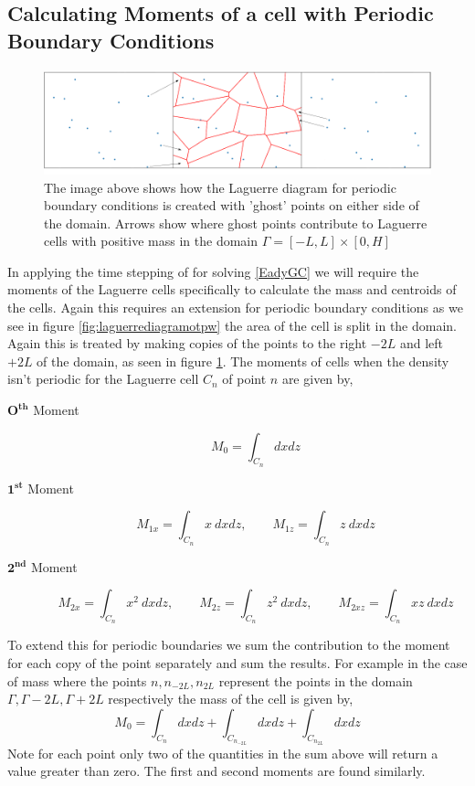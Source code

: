 \subsection{Calculating Moments of a cell with Periodic Boundary Conditions}
\begin{figure}[ht!]
	\centering
	\includegraphics[width=1\linewidth]{project/laguerre_diagram_OTPw_periodic}
	\caption[Periodic boundary conditions with 'ghost' points]{The image above shows how the Laguerre diagram for periodic boundary conditions is created with 'ghost' points on either side of the domain. Arrows show where ghost points contribute to Laguerre cells with positive mass in the domain $\Gamma = [-L,L]\times [0,H]$ }
	\label{laguerre diagram copies}
\end{figure}
In applying the time stepping of for solving \ref{EadyGC} we will require the moments of the Laguerre cells specifically to calculate the mass and centroids of the cells. Again this requires an extension for periodic boundary conditions as we see in figure \ref{fig:laguerrediagramotpw} the area of the cell is split in the domain. Again this is treated by making copies of the points to the right $-2L$ and left $+2L$ of the domain, as seen in figure \ref{laguerre diagram copies}. The moments of cells when the density isn't periodic for the Laguerre cell $C_n$ of point $n$  are given by,
\begin{description}
	\item [$\bm{O^{th}}$ Moment] 
	\begin{equation}
	M_0 = \int_{C_n} dxdz
	\end{equation}
	\item[$\bm{1^{st}}$ Moment]
	\begin{equation}
	M_{1x} = \int_{C_n} x \ dxdz, \qquad M_{1z} = \int_{C_n} z \ dxdz
	\end{equation}
	\item[$\bm{2^{nd}}$ Moment]
	\begin{equation}
	M_{2x} = \int_{C_n} x^2 \ dxdz, \qquad M_{2z} = \int_{C_n} z^2 \ dxdz, \qquad M_{2xz} = \int_{C_n} xz \ dxdz
	\end{equation}	
\end{description}
To extend this for periodic boundaries we sum the contribution to the moment for each copy of the point separately and sum the results. For example in the case of mass where the points $n, n_{-2L}, n_{2L}$ represent the points in the domain $\Gamma,\Gamma -2L, \Gamma +2L$ respectively the mass of the cell is given by,
\begin{equation}
	M_0 = \int_{C_n} dxdz + \int_{C_{n_{-2L}}} dxdz + \int_{C_{n_{2L}}} dxdz
\end{equation}
Note for each point only two of the quantities in the sum above will return a value greater than zero. The first and second moments are found similarly.

